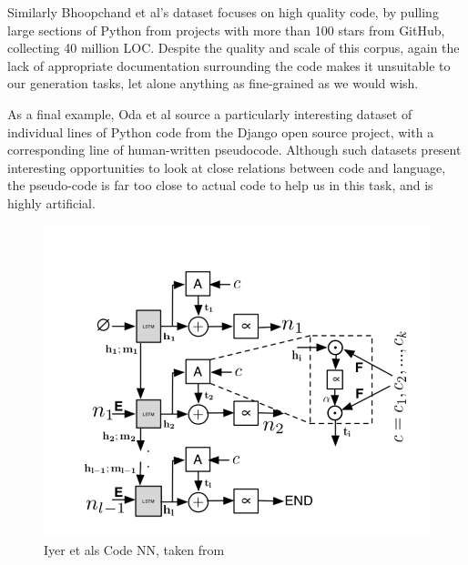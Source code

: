 Similarly Bhoopchand et al's \cite{bhoopchand_learning_2016} dataset focuses on high quality code, by pulling large sections of Python from projects with more than 100 stars from GitHub, collecting 40 million LOC. 
Despite the quality and scale of this corpus, again the lack of appropriate documentation surrounding the code makes it unsuitable to our generation tasks, let alone anything as fine-grained as we would wish.

As a final example, Oda et al\cite{oda_learning_nodate} source a particularly interesting dataset of individual lines of Python code from the Django open source project, with a corresponding line of human-written pseudocode. Although such datasets present interesting opportunities to look at close relations between code and language, the pseudo-code is far too close to actual code to help us in this task, and is highly artificial. 



\begin{figure}[tb]
    \centering
    \includegraphics[width=0.5\linewidth]{ModelPics/Iyer_etal.png}
    \caption{Iyer et als Code NN, taken from \cite{iyer_summarizing_2016}}
    \label{fig:Iyer}
\end{figure}



